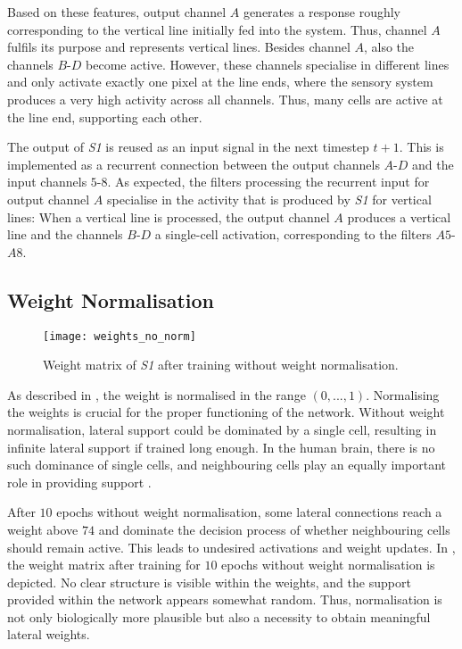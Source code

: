 Based on these features, output channel $A$ generates a response roughly corresponding to the vertical line initially fed into the system.
Thus, channel $A$ fulfils its purpose and represents vertical lines.
Besides channel $A$, also the channels $B$-$D$ become active.
However, these channels specialise in different lines and only activate exactly one pixel at the line ends, where the sensory system produces a very high activity across all channels.
Thus, many cells are active at the line end, supporting each other.

The output of \emph{S1} is reused as an input signal in the next timestep $t+1$.
This is implemented as a recurrent connection between the output channels $A$-$D$ and the input channels $5$-$8$.
As expected, the filters processing the recurrent input for output channel $A$ specialise in the activity that is produced by \emph{S1} for vertical lines:
When a vertical line is processed, the output channel $A$ produces a vertical line and the channels $B$-$D$ a single-cell activation, corresponding to the filters $A5$-$A8$.


\subsection{Weight Normalisation}
%
\begin{figure}[h]
    \centering
    \texttt{[image: weights\_no\_norm]}
    \caption[Weights after training without normalisation]{Weight matrix of \emph{S1} after training without weight normalisation.}
\end{figure}
%
As described in , the weight is normalised in the range $(0, ..., 1)$.
Normalising the weights is crucial for the proper functioning of the network. Without weight normalisation, lateral support could be dominated by a single cell, resulting in infinite lateral support if trained long enough. In the human brain, there is no such dominance of single cells, and neighbouring cells play an equally important role in providing support .

After $10$ epochs without weight normalisation, some lateral connections reach a weight above $74$ and dominate the decision process of whether neighbouring cells should remain active.
This leads to undesired activations and weight updates. 
In , the weight matrix after training for $10$ epochs without weight normalisation is depicted.
No clear structure is visible within the weights, and the support provided within the network appears somewhat random. 
Thus, normalisation is not only biologically more plausible but also a necessity to obtain meaningful lateral weights.



